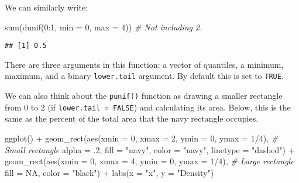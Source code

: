 \documentclass[
]{book}
\newenvironment{Shaded}{\begin{snugshade}}{\end{snugshade}}
\newcommand{\AttributeTok}[1]{\textcolor[rgb]{0.77,0.63,0.00}{#1}}
\newcommand{\CommentTok}[1]{\textcolor[rgb]{0.56,0.35,0.01}{\textit{#1}}}
\newcommand{\ConstantTok}[1]{\textcolor[rgb]{0.00,0.00,0.00}{#1}}
\newcommand{\DecValTok}[1]{\textcolor[rgb]{0.00,0.00,0.81}{#1}}
\newcommand{\FunctionTok}[1]{\textcolor[rgb]{0.00,0.00,0.00}{#1}}
\newcommand{\NormalTok}[1]{#1}
\newcommand{\SpecialCharTok}[1]{\textcolor[rgb]{0.00,0.00,0.00}{#1}}
\newcommand{\StringTok}[1]{\textcolor[rgb]{0.31,0.60,0.02}{#1}}
\begin{document}
We can similarly write:

\begin{Shaded}
\begin{Highlighting}[]
\FunctionTok{sum}\NormalTok{(}\FunctionTok{dunif}\NormalTok{(}\DecValTok{0}\SpecialCharTok{:}\DecValTok{1}\NormalTok{, }\AttributeTok{min =} \DecValTok{0}\NormalTok{, }\AttributeTok{max =} \DecValTok{4}\NormalTok{)) }\CommentTok{\# Not including 2.}
\end{Highlighting}
\end{Shaded}

\begin{verbatim}
## [1] 0.5
\end{verbatim}

There are three arguments in this function: a vector of quantiles, a minimum, maximum, and a binary \texttt{lower.tail} argument. By default this is set to \texttt{TRUE}.

We can also think about the \texttt{punif()} function as drawing a smaller rectangle from 0 to 2 (if \texttt{lower.tail\ =\ FALSE}) and calculating its area. Below, this is the same as the percent of the total area that the navy rectangle occupies.

\begin{Shaded}
\begin{Highlighting}[]
\FunctionTok{ggplot}\NormalTok{() }\SpecialCharTok{+}
  \FunctionTok{geom\_rect}\NormalTok{(}\FunctionTok{aes}\NormalTok{(}\AttributeTok{xmin =} \DecValTok{0}\NormalTok{, }\AttributeTok{xmax =} \DecValTok{2}\NormalTok{, }\AttributeTok{ymin =} \DecValTok{0}\NormalTok{, }\AttributeTok{ymax =} \DecValTok{1}\SpecialCharTok{/}\DecValTok{4}\NormalTok{),  }\CommentTok{\# Small rectangle}
            \AttributeTok{alpha =}\NormalTok{ .}\DecValTok{2}\NormalTok{, }
            \AttributeTok{fill =} \StringTok{"navy"}\NormalTok{, }
            \AttributeTok{color =} \StringTok{"navy"}\NormalTok{, }
            \AttributeTok{linetype =} \StringTok{"dashed"}\NormalTok{) }\SpecialCharTok{+}
    \FunctionTok{geom\_rect}\NormalTok{(}\FunctionTok{aes}\NormalTok{(}\AttributeTok{xmin =} \DecValTok{0}\NormalTok{, }\AttributeTok{xmax =} \DecValTok{4}\NormalTok{, }\AttributeTok{ymin =} \DecValTok{0}\NormalTok{, }\AttributeTok{ymax =} \DecValTok{1}\SpecialCharTok{/}\DecValTok{4}\NormalTok{), }\CommentTok{\# Large rectangle}
              \AttributeTok{fill =} \ConstantTok{NA}\NormalTok{, }
              \AttributeTok{color =} \StringTok{"black"}\NormalTok{) }\SpecialCharTok{+}
  \FunctionTok{labs}\NormalTok{(}\AttributeTok{x =} \StringTok{"x"}\NormalTok{, }\AttributeTok{y =} \StringTok{"Density"}\NormalTok{)}
\end{Highlighting}
\end{Shaded}
\end{document}
